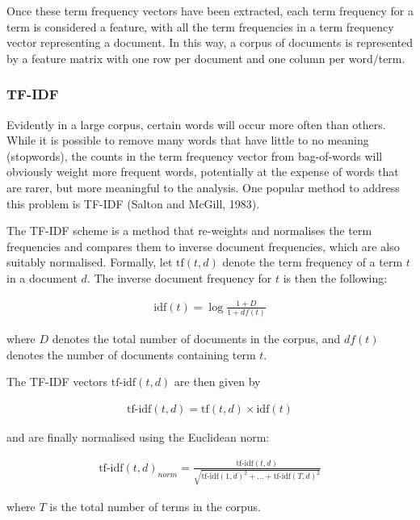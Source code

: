 \documentclass[11pt,preprint, authoryear]{article}
\begin{document}
Once these term frequency vectors have been extracted, each term
frequency for a term is considered a feature, with all the term
frequencies in a term frequency vector representing a document. In this
way, a corpus of documents is represented by a feature matrix with one
row per document and one column per word/term.

\subsubsection{TF-IDF}\label{tf-idf}

Evidently in a large corpus, certain words will occur more often than
others. While it is possible to remove many words that have little to no
meaning (stopwords), the counts in the term frequency vector from
bag-of-words will obviously weight more frequent words, potentially at
the expense of words that are rarer, but more meaningful to the
analysis. One popular method to address this problem is TF-IDF (Salton
and McGill, 1983).

The TF-IDF scheme is a method that re-weights and normalises the term
frequencies and compares them to inverse document frequencies, which are
also suitably normalised. Formally, let \(\text{tf}(t, d)\) denote the
term frequency of a term \(t\) in a document \(d\). The inverse document
frequency for \(t\) is then the following:

\begin{align} \label{eq:idf}
\text{idf}(t) = \log \frac{1 + D}{1 + df(t)}
\end{align}

where \(D\) denotes the total number of documents in the corpus, and
\(df(t)\) denotes the number of documents containing term \(t\).

The TF-IDF vectors \(\text{tf-idf}(t, d)\) are then given by

\begin{align} \label{eq:tf_idf}
\text{tf-idf}(t, d) = \text{tf}(t, d) \times \text{idf}(t)
\end{align}

\newpage

and are finally normalised using the Euclidean norm:

\begin{align} \label{eq:tf_idf_norm}
\text{tf-idf}(t, d)_{norm} = \frac{\text{tf-idf}(t, d)}{ \sqrt{\text{tf-idf}(1, d)^2 + ... + \text{tf-idf}(T, d)^2} }
\end{align}

where \(T\) is the total number of terms in the corpus.
\end{document}
